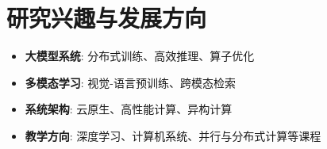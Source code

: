 \section{\makebox[\widthof{\faCompass}][c]{\color{USTB_Blue}{\faCompass}}\quad 研究兴趣与发展方向}
\vspace{0.3em}
\begin{itemize}
    \item \textbf{大模型系统}: 分布式训练、高效推理、算子优化
    \item \textbf{多模态学习}: 视觉-语言预训练、跨模态检索
    \item \textbf{系统架构}: 云原生、高性能计算、异构计算
    \item \textbf{教学方向}: 深度学习、计算机系统、并行与分布式计算等课程
\end{itemize}


